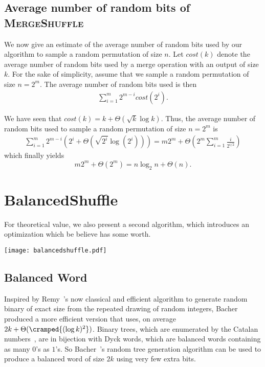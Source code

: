 \documentclass[letter,11pt,en]{quick-document}
\begin{document}
\subsection{Average number of random bits of \textsc{MergeShuffle}}

We now give an estimate of the average number of random bits used by our
algorithm to sample a random permutation of size $n$. Let $cost(k)$ denote
the average number of random bits used by a merge operation with an output
of size $k$. For the sake of simplicity, assume that we sample a random
permutation of size $n = 2^m$. The average number of random bits used is
then
\begin{align*}\sum_{i=1}^m 2^{m-i} cost(2^i).
\end{align*}

We have seen that $cost(k) = k + \Theta (\sqrt{k} \log k)$. Thus, the
average number of random bits used to sample a random permutation of size
$n = 2^m$ is
\begin{align*}
\sum_{i=1}^m 2^{m-i} \left(2^i + \Theta \left(\sqrt{2^i} \log (2^i)\right)\right) = m 2^m + \Theta \left(2^m \sum_{i=1}^m \frac{i}{2^{i/2}}\right)
\end{align*}
which finally yields
\begin{equation*}
m 2^m + \Theta (2^m) = n \log_2 n + \Theta (n).
\end{equation*}





\section{BalancedShuffle}

For theoretical value, we also present a second algorithm, which
introduces an optimization which be believe has some worth.

\begin{bigcenter}
\texttt{[image: balancedshuffle.pdf]}
\end{bigcenter}

\subsection{Balanced Word}


Inspired by Remy~\cite{Remy85}'s now classical and efficient algorithm to
generate random binary of exact size from the repeated drawing of random
integers, Bacher~\etal~\cite{BaBoJa14} produced a more efficient version
that uses, on average $2k + \Theta(\cramped{(\log k)^2})$. Binary trees,
which are enumerated by the Catalan numbers~\cite{Stanley15}, are in
bijection with Dyck words, which are balanced words containing as many
$0$'s as $1$'s. So Bacher~\etal's random tree generation algorithm can be
used to produce a balanced word of size $2k$ using very few extra bits.
\end{document}

